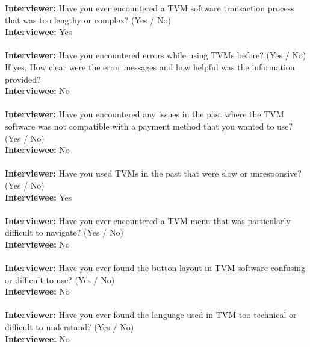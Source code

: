 \documentclass[a4paper,12pt]{report}
\begin{document}
\textbf{Interviewer:} Have you ever encountered a TVM software transaction process that was too lengthy or complex? (Yes / No)\\
\textbf{Interviewee:} Yes\\\\
\textbf{Interviewer:}  Have you encountered errors while using TVMs before? (Yes / No) If yes, How clear were the error messages and how helpful was the information provided?\\
\textbf{Interviewee:} No\\\\
\textbf{Interviewer:}  Have you encountered any issues in the past where the TVM software was not compatible with a payment method that you wanted to use? (Yes / No)\\
\textbf{Interviewee:} No\\\\
\textbf{Interviewer:}  Have you used TVMs in the past that were slow or unresponsive? (Yes / No)\\
\textbf{Interviewee:} Yes\\\\
\textbf{Interviewer:}  Have you ever encountered a TVM menu that was particularly difficult to navigate? (Yes / No)\\
\textbf{Interviewee:} No\\\\
\textbf{Interviewer:}  Have you ever found the button layout in TVM software confusing or difficult to use? (Yes / No) \\
\textbf{Interviewee:} No\\\\
\textbf{Interviewer:} Have you ever found the language used in TVM too technical or difficult to understand? (Yes / No) \\
\textbf{Interviewee:} No\\\\
\end{document}
